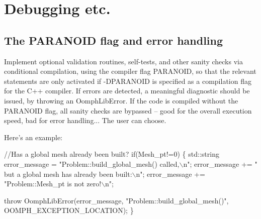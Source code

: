  

\hypertarget{index_debug}{}\section{Debugging etc.}\label{index_debug}
\hypertarget{index_paranoia}{}\subsection{The P\-A\-R\-A\-N\-O\-I\-D flag and error handling}\label{index_paranoia}

\begin{DoxyItemize}
\item Implement optional validation routines, self-\/tests, and other sanity checks via conditional compilation, using the compiler flag P\-A\-R\-A\-N\-O\-I\-D, so that the relevant statements are only activated if {\ttfamily -\/\-D\-P\-A\-R\-A\-N\-O\-I\-D} is specified as a compilation flag for the C++ compiler. If errors are detected, a meaningful diagnostic should be issued, by throwing an {\ttfamily Oomph\-Lib\-Error}. If the code is compiled without the P\-A\-R\-A\-N\-O\-I\-D flag, all sanity checks are bypassed -- good for the overall execution speed, bad for error handling... The user can choose. \par
\par
 Here's an example\-: \par
\par
 
\begin{DoxyCode}
\textcolor{comment}{//Has a global mesh already been built?}
\textcolor{keywordflow}{if}(Mesh\_pt!=0)
 \{
  std::string error\_message = 
   \textcolor{stringliteral}{"Problem::build\_global\_mesh() called,\(\backslash\)n"};
  error\_message += \textcolor{stringliteral}{" but a global mesh has already been built:\(\backslash\)n"};
  error\_message += \textcolor{stringliteral}{"Problem::Mesh\_pt is not zero!\(\backslash\)n"};

  \textcolor{keywordflow}{throw} OomphLibError(error\_message,
                      \textcolor{stringliteral}{"Problem::build\_global\_mesh()"},
                      OOMPH\_EXCEPTION\_LOCATION);
 \}
\end{DoxyCode}


\end{DoxyItemize}
